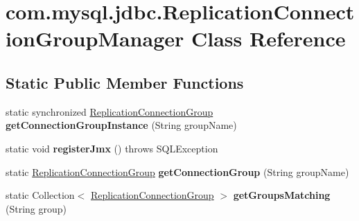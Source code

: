 \hypertarget{classcom_1_1mysql_1_1jdbc_1_1_replication_connection_group_manager}{}\section{com.\+mysql.\+jdbc.\+Replication\+Connection\+Group\+Manager Class Reference}
\label{classcom_1_1mysql_1_1jdbc_1_1_replication_connection_group_manager}
\subsection*{Static Public Member Functions}
\begin{DoxyCompactItemize}
\item 
\mbox{\label{classcom_1_1mysql_1_1jdbc_1_1_replication_connection_group_manager_a8b7b8becd805bdfa8c3ab65bd17e2aa7}} 
static synchronized \mbox{\hyperlink{classcom_1_1mysql_1_1jdbc_1_1_replication_connection_group}{Replication\+Connection\+Group}} {\bfseries get\+Connection\+Group\+Instance} (String group\+Name)
\item 
\mbox{\label{classcom_1_1mysql_1_1jdbc_1_1_replication_connection_group_manager_ae3bd10474c238f971b0481e3fe74425e}} 
static void {\bfseries register\+Jmx} ()  throws S\+Q\+L\+Exception 
\item 
\mbox{\label{classcom_1_1mysql_1_1jdbc_1_1_replication_connection_group_manager_a0c03e4a34a22d70beff8c8abef104634}} 
static \mbox{\hyperlink{classcom_1_1mysql_1_1jdbc_1_1_replication_connection_group}{Replication\+Connection\+Group}} {\bfseries get\+Connection\+Group} (String group\+Name)
\item 
\mbox{\label{classcom_1_1mysql_1_1jdbc_1_1_replication_connection_group_manager_ae65a1277ebacf40e2498fc2e4158c8ae}} 
static Collection$<$ \mbox{\hyperlink{classcom_1_1mysql_1_1jdbc_1_1_replication_connection_group}{Replication\+Connection\+Group}} $>$ {\bfseries get\+Groups\+Matching} (String group)
\item 
\mbox{\label{classcom_1_1mysql_1_1jdbc_1_1_replication_connection_group_manager_adf795b80b0bd84212bcd93fb823bd556}} 

\end{DoxyCompactItemize}
